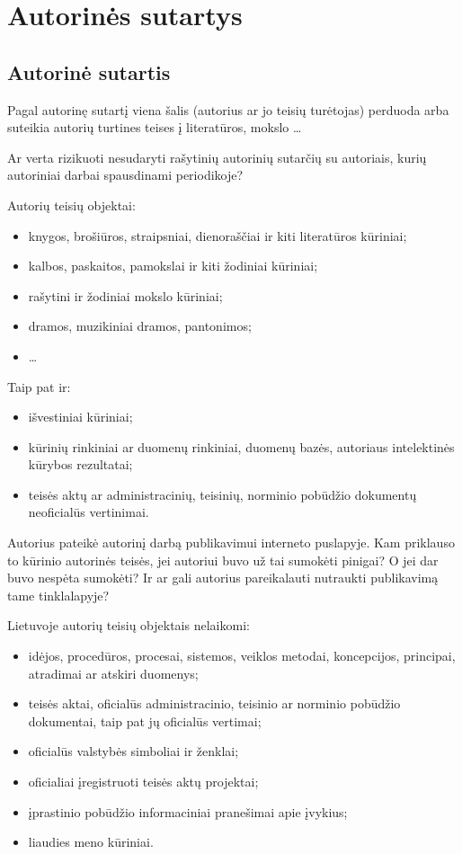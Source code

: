 \chapter{Autorinės sutartys}

\section{Autorinė sutartis}

Pagal autorinę sutartį viena šalis (autorius ar jo teisių turėtojas)
perduoda arba suteikia autorių turtines teises į literatūros, mokslo
…

Ar verta rizikuoti nesudaryti rašytinių autorinių sutarčių su autoriais,
kurių autoriniai darbai spausdinami periodikoje?

Autorių teisių objektai:
\begin{itemize}
  \item knygos, brošiūros, straipsniai, dienoraščiai ir kiti literatūros
    kūriniai;
  \item kalbos, paskaitos, pamokslai ir kiti žodiniai kūriniai;
  \item rašytini ir žodiniai mokslo kūriniai;
  \item dramos, muzikiniai dramos, pantonimos;
  \item …
\end{itemize}
Taip pat ir:
\begin{itemize}
  \item išvestiniai kūriniai;
  \item kūrinių rinkiniai ar duomenų rinkiniai, duomenų bazės,
    autoriaus intelektinės kūrybos rezultatai;
  \item teisės aktų ar administracinių, teisinių, norminio pobūdžio
    dokumentų neoficialūs vertinimai.
\end{itemize}

Autorius pateikė autorinį darbą publikavimui interneto puslapyje.
Kam priklauso to kūrinio autorinės teisės, jei autoriui buvo už
tai sumokėti pinigai? O jei dar buvo nespėta sumokėti? Ir ar gali
autorius pareikalauti nutraukti publikavimą tame tinklalapyje?

Lietuvoje autorių teisių objektais nelaikomi:
\begin{itemize}
  \item idėjos, procedūros, procesai, sistemos, veiklos metodai,
    koncepcijos, principai, atradimai ar atskiri duomenys;
  \item teisės aktai, oficialūs administracinio, teisinio ar norminio
    pobūdžio dokumentai, taip pat jų oficialūs vertimai;
  \item oficialūs valstybės simboliai ir ženklai;
  \item oficialiai įregistruoti teisės aktų projektai;
  \item įprastinio pobūdžio informaciniai pranešimai apie įvykius;
  \item liaudies meno kūriniai.
\end{itemize}

